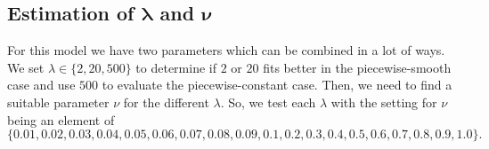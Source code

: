 \documentclass[abstracton]{scrreprt}
\begin{document}
        \subsection{Estimation of $\boldsymbol{\lambda}$ and $\boldsymbol{\nu}$} %
        \label{sub:estimation_of_lambda_and_nu_rt}
            
            For this model we have two parameters which can be combined in a lot of ways. We set $\lambda \in \{2, 20, 500\}$ to determine if $2$ or $20$ fits better in the piecewise-smooth case and use $500$ to evaluate the piecewise-constant case. Then, we need to find a suitable parameter $\nu$ for the different $\lambda$. So, we test each $\lambda$ with the setting for $\nu$ being an element of
                $$
                    \{0.01, 0.02, 0.03, 0.04, 0.05, 0.06, 0.07, 0.08, 0.09, 0.1, 0.2, 0.3, 0.4, 0.5, 0.6, 0.7, 0.8, 0.9, 1.0 \}.
                $$
\end{document}
